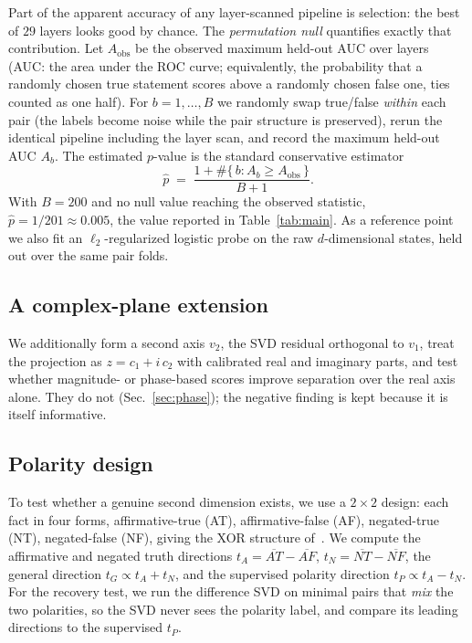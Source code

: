 \documentclass[11pt]{article}
\begin{document}
Part of the apparent accuracy of any layer-scanned pipeline is selection: the
best of $29$ layers looks good by chance. The \emph{permutation null}
quantifies exactly that contribution. Let $A_{\mathrm{obs}}$ be the observed
maximum held-out AUC over layers (AUC: the area under the ROC curve; equivalently, the probability that a
randomly chosen true statement scores above a randomly chosen false one,
ties counted as one half). For $b = 1, \dots, B$ we randomly swap
true/false \emph{within} each pair (the labels become noise while the pair
structure is preserved), rerun the identical pipeline including the layer
scan, and record the maximum held-out AUC $A_b$. The estimated $p$-value is
the standard conservative estimator
\begin{equation}
\hat{p} \;=\; \frac{1 + \#\{\,b : A_b \ge A_{\mathrm{obs}}\,\}}{B + 1}.
\end{equation}
With $B = 200$ and no null value reaching the observed statistic,
$\hat{p} = 1/201 \approx 0.005$, the value reported in
Table~\ref{tab:main}. As a reference point we also fit an
$\ell_2$-regularized logistic probe on the raw $d$-dimensional states, held
out over the same pair folds.

\subsection{A complex-plane extension}
\label{sec:complexmethod}

We additionally form a second axis $v_2$, the SVD residual orthogonal to
$v_1$, treat the projection as $z = c_1 + i\,c_2$ with calibrated real and
imaginary parts, and test whether magnitude- or phase-based scores improve
separation over the real axis alone. They do not (Sec.~\ref{sec:phase}); the
negative finding is kept because it is itself informative.

\subsection{Polarity design}
\label{sec:poldesign}

To test whether a genuine second dimension exists, we use a $2{\times}2$
design: each fact in four forms, affirmative-true (AT), affirmative-false
(AF), negated-true (NT), negated-false (NF), giving the XOR structure
of~\cite{burger2024}. We compute the affirmative and negated truth directions
$t_A = \overline{AT} - \overline{AF}$, $t_N = \overline{NT} - \overline{NF}$,
the general direction $t_G \propto t_A + t_N$, and the supervised polarity
direction $t_P \propto t_A - t_N$. For the recovery test, we run the
difference SVD on minimal pairs that \emph{mix} the two polarities, so the
SVD never sees the polarity label, and compare its leading directions to the
supervised $t_P$.
\end{document}
